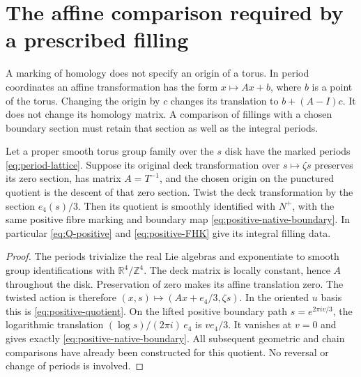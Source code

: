 \section{The affine comparison required by a prescribed filling}

A marking of homology does not specify an origin of a torus.
In period coordinates an affine transformation has the form
$x\mapsto Ax+b$, where $b$ is a point of the torus. Changing the
origin by $c$ changes its translation to $b+(A-I)c$.
It does not change its homology matrix. A comparison of fillings
with a chosen boundary section must retain that section as well
as the integral periods.

\begin{proposition}\label{prop:marked-comparison}
Let a proper smooth torus group family over the $s$ disk have
the marked periods \eqref{eq:period-lattice}. Suppose its original
deck transformation over $s\mapsto\zeta s$ preserves its zero
section, has matrix $A=T^{-1}$, and the chosen origin on the
punctured quotient is the descent of that zero section. Twist the
deck transformation by the section $e_4(s)/3$. Then its quotient
is smoothly identified with $N^+$, with the same positive fibre
marking and boundary map \eqref{eq:positive-native-boundary}.
In particular \eqref{eq:Q-positive} and
\eqref{eq:positive-FHK} give its integral filling data.
\end{proposition}
\begin{proof}
The periods trivialize the real Lie algebras and exponentiate to
smooth group identifications with $\mathbb R^4/\mathbb Z^4$.
The deck matrix is locally constant, hence $A$ throughout the disk.
Preservation of zero makes its affine translation zero. The twisted
action is therefore $(x,s)\mapsto(Ax+e_4/3,\zeta s)$.
In the oriented $u$ basis this is \eqref{eq:positive-quotient}.
On the lifted positive boundary path $s=e^{2\pi iv/3}$,
the logarithmic translation
$(\log s)/(2\pi i)\,e_4$ is $ve_4/3$. It vanishes at $v=0$
and gives exactly \eqref{eq:positive-native-boundary}.
All subsequent geometric and chain comparisons have already been
constructed for this quotient. No reversal or change of periods is
involved.
\end{proof}

